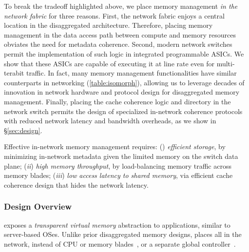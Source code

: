 To break the tradeoff highlighted above, we place memory management \textit{in the network fabric} for three reasons.
First, the network fabric enjoys a central location in the disaggregated architecture. Therefore, placing memory management in the data access path between compute and memory resources obviates the need for metadata coherence. 
Second, modern network switches~\cite{progswitch1, progswitch2, progswitch3} permit the implementation of such logic in integrated programmable ASICs. We show that these ASICs are capable of executing it at line rate even for multi-terabit traffic. In fact, many memory management functionalities have similar counterparts in networking (\autoref{table:isomorph}), allowing us to leverage decades of innovation in network hardware and protocol design for disaggregated memory management.
Finally, placing the cache coherence logic and directory in the network switch permits the design of specialized in-network coherence protocols with reduced network latency and bandwidth overheads, as we show in \S\ref{sec:design}. 

Effective in-network memory management requires: () \emph{efficient storage}, by  minimizing in-network metadata given the limited memory on the switch data plane;  (\textit{ii}) \emph{high memory throughput}, by load-balancing memory traffic across memory blades; (\textit{iii}) \emph{low access latency to shared memory}, via efficient cache coherence design that hides the network latency.


\subsubsection{Design Overview}
\label{sssec:design}

\mind exposes a \textit{transparent virtual memory} abstraction to applications, similar to server-based OSes. Unlike prior disaggregated memory designs, \mind places all \mmm in the network, instead of CPU or memory blades~\cite{infiniswap, fastswap}, or a separate global controller~\cite{legoos}. 


